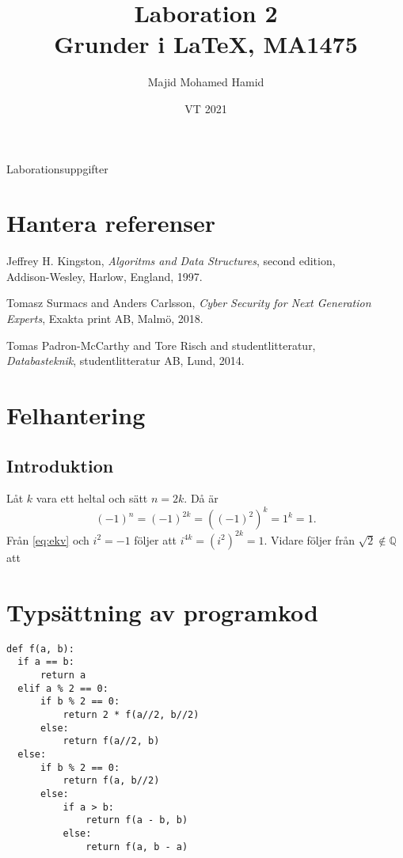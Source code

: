 \documentclass[a4paper, titlepage]{article}
\title{Laboration 2\\Grunder i \LaTeX, MA1475}%
\author{Majid Mohamed Hamid}
\date{VT 2021}
\begin{document}
\maketitle
\begin{center} 
Laborationsuppgifter 
\end{center}

\section{Hantera referenser}

\begin{thebibliography}{0}
 Jeffrey H. Kingston, \emph{Algoritms and Data Structures}, second edition,\\ Addison-Wesley, Harlow, England, 1997.

 Tomasz Surmacs and Anders Carlsson, \emph{Cyber Security for Next Generation\\Experts}, Exakta print AB, Malmö, 2018.

 Tomas Padron-McCarthy and Tore Risch and studentlitteratur, \\\emph{Databasteknik}, studentlitteratur AB, Lund, 2014. 
\end{thebibliography}

\section{Felhantering}
\subsection*{Introduktion}
Låt $k$ vara ett heltal och sätt $n = 2k$. Då är
\begin{equation}\label{eq:ekv}
(-1)^n = (-1)^{2k} = ((-1)^2)^k = 1^k = 1.
\end{equation}
Från \ref{eq:ekv} och $i^2 = -1$ följer att $i^{4k} = (i^2)^{2k} = 1.$ 
Vidare följer från $\sqrt{2} \notin \mathbb{Q}$ att


\section{Typsättning av programkod}
\begin{verbatim}
def f(a, b):
  if a == b:
      return a
  elif a % 2 == 0:
      if b % 2 == 0:
          return 2 * f(a//2, b//2)
      else:
          return f(a//2, b)
  else:
      if b % 2 == 0:
          return f(a, b//2)
      else:
          if a > b:
              return f(a - b, b)
          else:
              return f(a, b - a)
\end{verbatim}                
\end{document}
